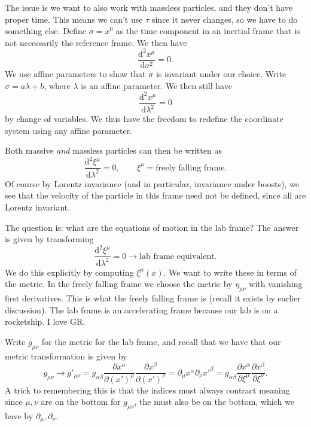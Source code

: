 The issue is we want to also work with massless particles, and they don't have proper time. This means we can't use $\tau $ since it never changes, so we have to do something else. Define $\sigma =x^0$ as the time component in an inertial frame that is not necessarily the reference frame. We then have
\[
	\frac{\mathrm{d}^2x^\mu }{\mathrm{d}\sigma ^2} =0
.\]
We use affine parameters to show that $\sigma $ is invariant under our choice. Write $\sigma =a\lambda +b$, where $\lambda $ is an affine parameter. We then still have
\[
	\frac{\mathrm{d}^2x^\mu }{\mathrm{d}\lambda ^2} =0
\]
by change of variables. We thus have the freedom to redefine the coordinate system using any affine parameter.

Both massive \emph{and} massless particles can then be written as
\[
	\frac{\mathrm{d}^2\xi ^\mu }{\mathrm{d}\lambda ^2} =0,\qquad \xi ^\mu =\text{freely falling frame}.
\]
Of course by Lorentz invariance (and in particular, invariance under boosts), we see that the velocity of the particle in this frame need not be defined, since all are Lorentz invariant.

The question is: what are the equations of motion in the lab frame? The answer is given by transforming
\[
	\frac{\mathrm{d}^2\xi ^\mu }{\mathrm{d}\lambda ^2} =0 \to \text{lab frame equivalent} 
.\]
We do this explicitly by computing $\xi ^\mu (x)$. We want to write these in terms of the metric. In the freely falling frame we choose the metric by $\eta _{\mu \nu } $ with vanishing first derivatives. This is what the freely falling frame is (recall it exists by earlier discussion). The lab frame is an accelerating frame because our lab is on a rocketship. I love GR.

Write $g_{\mu \nu } $ for the metric for the lab frame, and recall that we have that our metric transformation is given by
\[
	g_{\mu \nu } \to g'_{\mu \nu } =g_{\alpha \beta } \frac{\partial x^\alpha }{\partial (x')^\mu } \frac{\partial x^\beta }{\partial (x')^\nu } =\partial _\mu x^\alpha \partial _\nu x'^\beta =g_{\alpha \beta } \frac{\partial x^\alpha }{\partial \xi ^\mu } \frac{\partial x^\beta }{\partial \xi ^\nu } 
.\]
A trick to remembering this is that the indices must always contract meaning since $\mu ,\nu $ are on the bottom for $g_{\mu \nu } $, the must also be on the bottom, which we have by $\partial _\mu ,\partial _\nu $.

